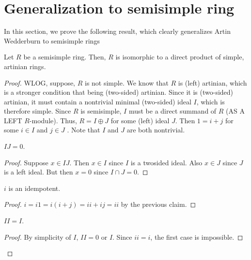 \section{Generalization to semisimple ring}
In this section, we prove the following result, which clearly generalizes Artin Wedderburn to semisimple rings
\begin{theorem}
  \label{thm:semisimple_direct_product_simple_artinian}
  \leanok
  Let $R$ be a semisimple ring. Then, $R$ is isomorphic to a direct product of simple, artinian rings.
\end{theorem}
\begin{proof}
  WLOG, suppose, $R$ is not simple. We know that $R$ is (left) artinian, which is a stronger condition that being (two-sided) artinian. Since it is (two-sided) artinian, it must contain a nontrivial minimal (two-sided) ideal $I$, which is therefore simple. Since $R$ is semisimple, $I$ must be a direct summand of $R$ (AS A LEFT $R$-module). Thus, $R = I \oplus J$ for some (left) ideal $J$. Then $1 = i + j$ for some $i \in I$ and $j \in J$ . Note that $I$ and $J$ are both nontrivial.
  \begin{claim}
    $I J = 0$.
  \end{claim}
  \begin{proof}
    \leanok
    Suppose $x \in I J$. Then $x \in I$ since $I$ is a twosided ideal. Also $x \in J$ since $J$ is a left ideal. But then $x = 0$ since $I \cap J = 0$.
  \end{proof}

  \begin{claim}
    $i$ is an idempotent.
  \end{claim}
  \begin{proof}
    \leanok
    \uses{} %
    $i = i 1 = i(i + j) = i i + i j = i i$ by the previous claim.
  \end{proof}

  \begin{claim}
    $I I = I$.
  \end{claim}
  \begin{proof}
    \leanok
    By simplicity of $I$, $I I = 0$ or $I$. Since $ i i = i$, the first case is impossible.
  \end{proof}


\end{proof}
